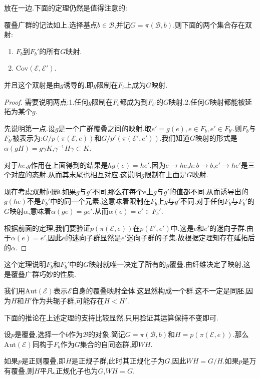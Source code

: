 放在一边.下面的定理仍然是值得注意的:
\begin{theorem}
    覆叠广群的记法如上.选择基点$b\in \mathcal{B}$,并记$G=\pi(\mathcal{B},b)$.则下面的两个集合存在双射:
    \begin{enumerate}
        \item $F_b$到$F_b'$的所有$G$映射.
        \item $\mathrm{Cov}(\mathcal{E},\mathcal{E'})$.
    \end{enumerate}
    并且这个双射是由$g$诱导的.即$g$限制在$F_b$上成为$G$映射.
\end{theorem}
\begin{proof}
    需要说明两点:1.任何$g$限制在$F_b$都成为到$F_{b'}$的$G$映射.2.任何$G$映射都能被延拓为某个$g$.

    先说明第一点.设$g$是一个广群覆叠之间的映射.取$e'=g(e),e\in F_b,e' \in F_{b'}$.则$F_b$与$F_{b'}$被表示为:$G/p(\pi(\mathcal{E},e))$和$G/p'(\pi(\mathcal{E}',e'))$.我们知道$G$映射的形式是$\alpha(gH)=g\gamma K$,$\gamma^{-1} H \gamma \subset K$.

    对于$he$,$g$作用在上面得到的结果是$hg(e)=he'$.因为$e \to he$,$h:b \to b$,$e' \to he'$是三个对应的态射.从而其末尾也相互对应.这说明$g$限制在上面是$G$映射.

    现在考虑双射问题.如果$g$与$g'$不同,那么在每个$e$上$g$与$g'$的值都不同.从而诱导出的$g(he)$不是$F_b'$中的同一个元素.这意味着限制在$F_b$上$g$与$g'$不同.对于任何$F_b$与$F_b'$的$G$映射$\alpha$,意味着$\alpha(ge)=ge'$.从而$\alpha(e)= e' \in F_b'$.

    根据前面的定理,我们要验证$p(\pi(\mathcal{E},e))$在$p(\mathcal{E}',e')$中.这是$e$和$e'$的迷向子群.由于$\alpha(e)=e'$,因此$e$的迷向子群显然是$e'$迷向子群的子集.故根据定理知存在延拓后的$\alpha$.
\end{proof}

这个定理说明$F_b$和$F_b'$中的$G$映射就唯一决定了所有的$g$覆叠.由纤维决定了映射,这是覆叠广群巧妙的性质.

我们用$\mathrm{Aut}(\mathcal{E})$表示$\mathcal{E}$自身的覆叠映射全体.这显然构成一个群.这不一定是同胚,因为$H$和$H'$作为共轭子群,可能存在$H <H'$.

下面的推论在上述定理的支持比较显然.只用验证其运算保持不变即可.
\begin{corollary}
    设$p$是覆叠,选择一个$b$作为$\mathcal{B}$的对象.简记$G=\pi(\mathcal{B},b)$和$H=p(\pi(\mathcal{E},e))$.那么$\mathrm{Aut}(\mathcal{E})$同构于$F_b$作为$G$集合的自同态群,即$WH$.

    如果$p$是正则覆叠,即$H$是正规子群,此时其正规化子为$G$,因此$WH=G/H$.如果$p$是万有覆叠,则$H$平凡,正规化子也为$G$,$WH=G$.
\end{corollary}
